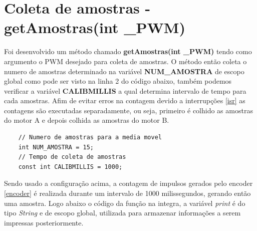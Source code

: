 \documentclass[a4paper,12pt,portuguese]{ufms-cpcx}
\begin{document}
\section{Coleta de amostras - getAmostras(int \_PWM)}\label{getamostras}
Foi desenvolvido um método chamado \textbf{getAmostras(int \_PWM)} tendo como argumento o PWM desejado para coleta de amostras.
O método então coleta o numero de amostras determinado na variável \textbf{NUM\_AMOSTRA} de escopo global como pode ser visto na linha 2 do código abaixo, também podemos verificar a variável \textbf{CALIBMILLIS} a qual determina intervalo de tempo para cada amostras. Afim de evitar erros na contagem devido a interrupções \ref{isr} as contagens são executadas separadamente, ou seja, primeiro é colhido as amostras do motor A e depois colhida as amostras do motor B.
\begin{lstlisting}
	// Numero de amostras para a media movel
	int NUM_AMOSTRA = 15;
	// Tempo de coleta de amostras
	const int CALIBMILLIS = 1000;
\end{lstlisting}
Sendo usado a configuração acima, a contagem de impulsos gerados pelo encoder \ref{encoder} é realizada durante um intervalo de 1000 milissegundos, gerando então uma amostra. 
Logo abaixo o código da função na integra, a variável \textit{print} é do tipo \textit{String} e de escopo global, utilizada para armazenar informações a serem impressas posteriormente.  
\end{document}
